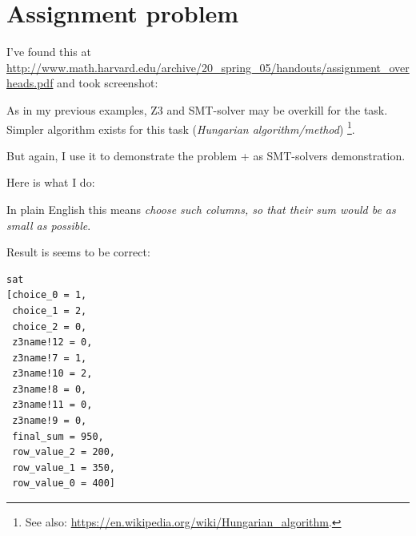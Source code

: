 \section{Assignment problem}
\label{assign_problem}

I've found this at \url{http://www.math.harvard.edu/archive/20_spring_05/handouts/assignment_overheads.pdf} and took screenshot:

\begin{figure}[H]
\centering
{}
\end{figure}

As in my previous examples, Z3 and SMT-solver may be overkill for the task.
Simpler algorithm exists for this task (\emph{Hungarian algorithm/method})
\footnote{See also: \url{https://en.wikipedia.org/wiki/Hungarian_algorithm}.}.

But again, I use it to demonstrate the problem + as SMT-solvers demonstration.

Here is what I do:



In plain English this means \emph{choose such columns, so that their sum would be as small as possible}.

Result is seems to be correct:

\begin{lstlisting}
sat
[choice_0 = 1,
 choice_1 = 2,
 choice_2 = 0,
 z3name!12 = 0,
 z3name!7 = 1,
 z3name!10 = 2,
 z3name!8 = 0,
 z3name!11 = 0,
 z3name!9 = 0,
 final_sum = 950,
 row_value_2 = 200,
 row_value_1 = 350,
 row_value_0 = 400]
\end{lstlisting}

